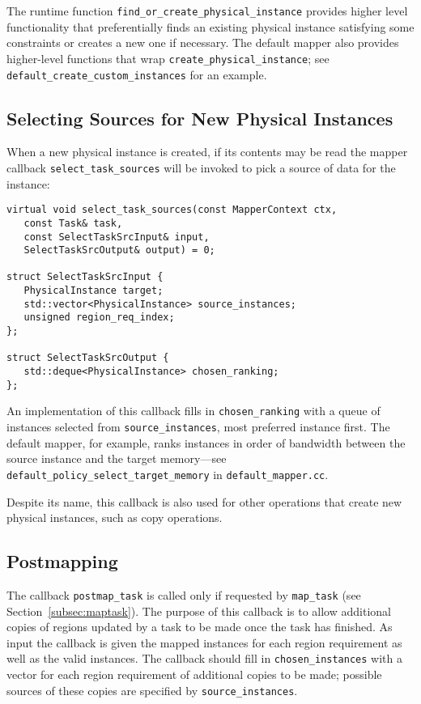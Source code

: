 The runtime function {\tt find\_or\_create\_physical\_instance} provides higher level functionality that preferentially finds an existing physical instance satisfying some constraints or creates a new one if necessary.  The default mapper also provides
higher-level functions that wrap {\tt create\_physical\_instance}; see {\tt default\_create\_custom\_instances} for an example.

\subsection{Selecting Sources for New Physical Instances}
\label{subsec:selectsources}
When a new physical instance is created, if its contents may be read the mapper callback {\tt select\_task\_sources} will be invoked to pick a source of data for the instance:

\begin{lstlisting}
virtual void select_task_sources(const MapperContext ctx,
   const Task& task,
   const SelectTaskSrcInput& input,
   SelectTaskSrcOutput& output) = 0;

struct SelectTaskSrcInput {
   PhysicalInstance target;
   std::vector<PhysicalInstance> source_instances;
   unsigned region_req_index;
};

struct SelectTaskSrcOutput {
   std::deque<PhysicalInstance> chosen_ranking;
};
\end{lstlisting}
An implementation of this callback fills in {\tt chosen\_ranking} with a queue of instances selected from {\tt source\_instances}, most preferred instance first.  The default mapper, for example, ranks instances in order of bandwidth between the
source instance and the target memory---see {\tt default\_policy\_select\_target\_memory} in {\tt default\_mapper.cc}.

Despite its name, this callback is also used for other operations that create new physical instances, such as copy operations.

\subsection{Postmapping}
\label{subsec:postmap}

The callback {\tt postmap\_task} is called only if requested by {\tt map\_task} (see Section~\ref{subsec:maptask}).  The purpose
of this callback is to allow additional copies of regions updated by a task to be made once the task has finished.  As input
the callback is given the mapped instances for each region requirement as well as the valid instances.  The callback should fill
in {\tt chosen\_instances} with a vector for each region requirement of additional copies to be made; possible sources of these
copies are specified by {\tt source\_instances}.

